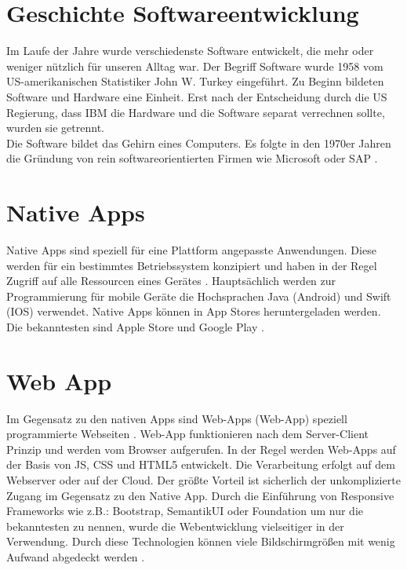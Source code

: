 \newpage
\section{Geschichte Softwareentwicklung}
Im Laufe der Jahre wurde verschiedenste Software entwickelt, die mehr oder weniger nützlich für unseren Alltag war.
Der Begriff Software wurde 1958 vom US-amerikanischen Statistiker John W. Turkey eingeführt.
Zu Beginn bildeten Software und Hardware eine Einheit. Erst nach der Entscheidung durch die US Regierung, dass IBM die Hardware und die Software separat verrechnen sollte, wurden sie getrennt. \\
Die Software bildet das Gehirn eines Computers.
Es folgte in den 1970er Jahren die Gründung von rein softwareorientierten Firmen wie Microsoft oder SAP \cite{Microsoft} \cite{SAP}. 

\section{Native Apps}\label{chap:Native Apps}
Native Apps sind speziell für eine Plattform angepasste Anwendungen. 
Diese werden für ein bestimmtes Betriebssystem konzipiert und haben in der Regel Zugriff auf alle Ressourcen eines Gerätes .
Hauptsächlich werden zur Programmierung für mobile Geräte die Hochsprachen Java (Android) und Swift (IOS) verwendet. Native Apps können in App Stores heruntergeladen  werden. \\Die bekanntesten sind Apple Store und Google Play \cite{NativeApp} \cite{Hochsprachen}.

\section{Web App}\label{chap:Webapplikationen}
Im Gegensatz zu den nativen Apps sind \acl{Web-App}s (\acs{Web-App}) speziell programmierte Webseiten .
\acs{Web-App} funktionieren nach dem Server-Client Prinzip und werden vom Browser aufgerufen. In der Regel werden \acs{Web-App}s auf der Basis von \acs{JS}, \acs{CSS} und \acs{HTML}5 entwickelt. Die Verarbeitung erfolgt auf dem Webserver oder auf der Cloud. 
Der größte Vorteil ist sicherlich der unkomplizierte Zugang im Gegensatz zu den Native App.
Durch die Einführung von Responsive Frameworks wie z.B.: Bootstrap, SemantikUI oder Foundation um nur die bekanntesten zu nennen, wurde die Webentwicklung vielseitiger in der Verwendung. Durch diese Technologien können viele Bildschirmgrößen mit wenig Aufwand abgedeckt werden \cite{Hochsprachen} \cite{WebApps} \cite{CSS}. 

